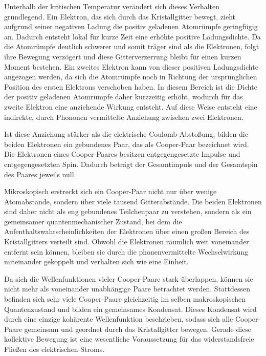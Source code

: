 \documentclass{article}
\begin{document}
Unterhalb der kritischen Temperatur verändert sich dieses Verhalten grundlegend. Ein Elektron, das sich durch das Kristallgitter bewegt, zieht aufgrund seiner negativen Ladung die positiv geladenen Atomrümpfe geringfügig an. Dadurch entsteht lokal für kurze Zeit eine erhöhte positive Ladungsdichte. Da die Atomrümpfe deutlich schwerer und somit träger sind als die Elektronen, folgt ihre Bewegung verzögert und diese Gitterverzerrung bleibt für einen kurzen Moment bestehen. Ein zweites Elektron kann von dieser positiven Ladungsdichte angezogen werden, da sich die Atomrümpfe noch in Richtung der ursprünglichen Position des ersten Elektrons verschoben haben. In diesem Bereich ist die Dichte der positiv geladenen Atomrümpfe daher kurzzeitig erhöht, wodurch für das zweite Elektron eine anziehende Wirkung entsteht. Auf diese Weise entsteht eine indirekte, durch Phononen vermittelte Anziehung zwischen zwei Elektronen.

Ist diese Anziehung stärker als die elektrische Coulomb-Abstoßung, bilden die beiden Elektronen ein gebundenes Paar, das als Cooper-Paar bezeichnet wird. Die Elektronen eines Cooper-Paares besitzen entgegengesetzte Impulse und entgegengesetzten Spin. Dadurch beträgt der Gesamtimpuls und der Gesamtspin des Paares jeweils null.

Mikroskopisch erstreckt sich ein Cooper-Paar nicht nur über wenige Atomabstände, sondern über viele tausend Gitterabstände. Die beiden Elektronen sind daher nicht als eng gebundenes Teilchenpaar zu verstehen, sondern als ein gemeinsamer quantenmechanischer Zustand, bei dem die Aufenthaltswahrscheinlichkeiten der Elektronen über einen großen Bereich des Kristallgitters verteilt sind. Obwohl die Elektronen räumlich weit voneinander entfernt sein können, bleiben sie durch die phonenvermittelte Wechselwirkung miteinander gekoppelt und verhalten sich wie eine Einheit.

Da sich die Wellenfunktionen vieler Cooper-Paare stark überlappen, können sie nicht mehr als voneinander unabhängige Paare betrachtet werden. Stattdessen befinden sich sehr viele Cooper-Paare gleichzeitig im selben makroskopischen Quantenzustand und bilden ein gemeinsames Kondensat. Dieses Kondensat wird durch eine einzige kohärente Wellenfunktion beschrieben, sodass sich alle Cooper-Paare gemeinsam und geordnet durch das Kristallgitter bewegen. Gerade diese kollektive Bewegung ist eine wesentliche Voraussetzung für das widerstandsfreie Fließen des elektrischen Stroms.
 \cite{demtroder_3} \cite{fprak_manual} \cite{wiki-superconducter} \cite{wiki-cooper}
\end{document}
